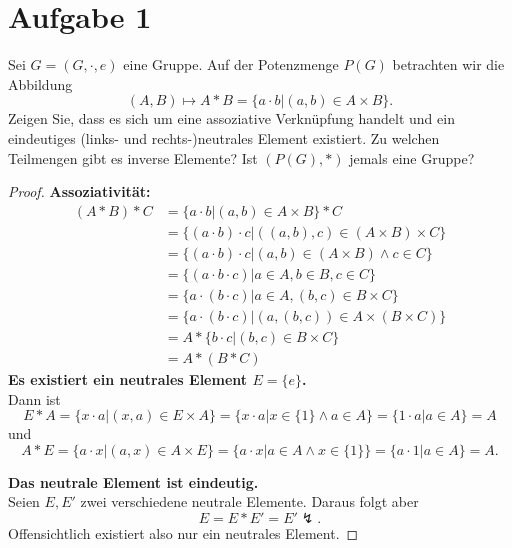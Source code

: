 \documentclass{article}
\begin{document}
	\section*{Aufgabe 1}
	Sei $G = (G,\cdot,e)$ eine Gruppe. Auf der Potenzmenge $P(G)$ betrachten wir die Abbildung
	\[(A, B)\mapsto A*B = \{a\cdot b | (a, b) \in  A \times B\}.\]
	Zeigen Sie, dass es sich um eine assoziative Verknüpfung handelt und ein eindeutiges (links- und rechts-)neutrales Element existiert. Zu welchen Teilmengen gibt es inverse Elemente? Ist $(P(G),*)$ jemals eine Gruppe?\\
	\begin{proof}
		\textbf{Assoziativität:}
		\begin{align*}
			(A*B)*C &= \{a\cdot b| (a,b) \in A\times B\}*C\\
					&= \{(a\cdot b)\cdot c| ((a,b), c) \in (A\times B)\times C\}\\
					&= \{(a\cdot b)\cdot c| (a,b) \in (A\times B)\land c \in C\}\\
					&= \{(a\cdot b \cdot c)| a\in A, b\in B, c\in C\}\\
					&= \{a\cdot (b\cdot c)| a\in A, (b,c) \in B\times C\}\\
					&= \{a\cdot (b\cdot c)| (a, (b,c)) \in A\times (B\times C)\}\\
					&= A * \{b\cdot c|(b,c) \in B\times C\}\\
					&= A * (B*C)
		\end{align*}
		\textbf{Es existiert ein neutrales Element $E = \{e\}$.}\\
		Dann ist \[E*A = \{x\cdot a| (x,a) \in E\times A\} = \{x\cdot a | x \in \{1\}\land a \in A\} = \{1\cdot a| a\in A\} = A\]
		und \[A*E = \{a\cdot x| (a,x) \in A\times E\} = \{a\cdot x | a \in A\land x \in \{1\}\} = \{a\cdot 1| a\in A\} = A.\]
		
		\textbf{Das neutrale Element ist eindeutig.}\\
		Seien $E, E'$ zwei verschiedene neutrale Elemente. Daraus folgt aber \[E = E * E' = E'\lightning.\]
		Offensichtlich existiert also nur ein neutrales Element.
		

\end{proof}
\end{document}
